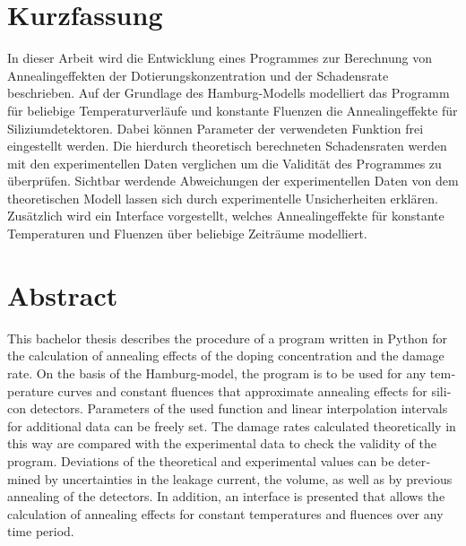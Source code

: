 \thispagestyle{plain}

\section*{Kurzfassung}
In dieser Arbeit wird die Entwicklung eines Programmes zur
Berechnung von Annealingeffekten der Dotierungskonzentration und der Schadensrate
beschrieben. Auf der Grundlage des Hamburg-Modells modelliert das Programm für beliebige
Temperaturverläufe und konstante Fluenzen die Annealingeffekte für Siliziumdetektoren.
Dabei können Parameter der verwendeten Funktion frei eingestellt werden.
Die hierdurch theoretisch berechneten Schadensraten werden mit den experimentellen Daten verglichen
um die Validität des Programmes zu überprüfen. Sichtbar werdende Abweichungen der
experimentellen Daten von dem theoretischen Modell lassen sich durch experimentelle Unsicherheiten erklären.
Zusätzlich wird ein Interface vorgestellt, welches Annealingeffekte für konstante Temperaturen und Fluenzen
über beliebige Zeiträume modelliert.

\section*{Abstract}
\begin{english}
  This bachelor thesis describes the procedure of a program written in Python for the
  calculation of annealing effects of the doping concentration and the damage rate.
  On the basis of the Hamburg-model, the program is to be used for any
  temperature curves and constant fluences that approximate annealing effects for silicon detectors.
  Parameters of the used function and linear interpolation intervals for
  additional data can be freely set.
  The damage rates calculated theoretically in this way are compared with the experimental data
  to check the validity of the program. Deviations of the
  theoretical and experimental values can be determined by uncertainties in the leakage current,
  the volume, as well as by previous annealing of the detectors.
  In addition, an interface is presented that allows the calculation of annealing effects for constant temperatures and fluences
  over any time period.

\end{english}
